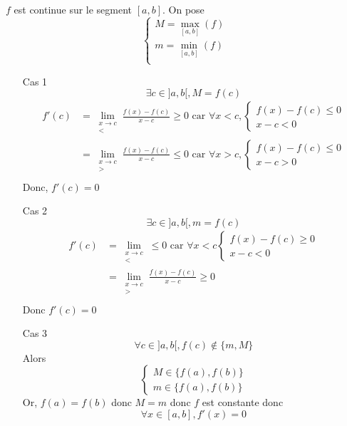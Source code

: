 \begin{prv}
	$f$ est continue sur le segment $[a,b]$. On pose \[
		\begin{cases}
			M = \max_{[a,b]}(f)\\
			m = \min_{[a,b]}(f)\\
		\end{cases}
	\] 

	\begin{itemize}
		\item[\sc Cas 1] \[
				\exists c \in ]a,b[, M = f(c)
			\] 
			\begin{align*}
				f'(c) &= \lim_{\substack{x \to c\\<}}\frac{f(x)-f(c)}{x-c} \ge 0 \text{ car } \forall x < c, \begin{cases}
					f(x) - f(c) \le 0\\
					x - c < 0
				\end{cases} \\
				&= \lim_{\substack{x \to c\\>}}\frac{f(x)-f(c)}{x-c} \le 0 \text{ car } \forall x > c, \begin{cases}
					f(x) - f(c) \le 0\\
					x - c > 0
				\end{cases} \\
			\end{align*}
			Donc, $f'(c) = 0$ 
		\item[\sc Cas 2]
			\[
				\exists c \in ]a,b[, m = f(c)
			\]
			\begin{align*}
				f'(c) &= \lim_{\substack{x \to c\\<}}\le 0 \text{ car } \forall x < c \begin{cases}
					f(x) - f(c) \ge 0\\
					x - c <0
				\end{cases} \\
				&= \lim_{\substack{x\to c\\>}} \frac{f(x) - f(c)}{x-c}\ge 0 \\
			\end{align*}
			Donc $f'(c) = 0$ 
		\item[\sc Cas 3] \[
				\forall c \in ]a,b[, f(c) \not\in \{m,M\}
			\] Alors \[
				\begin{cases}
					M \in \{f(a), f(b)\} \\
					m \in \{f(a), f(b)\} 
				\end{cases}
			\] Or, $f(a) = f(b)$ donc $M = m$ donc $f$ est constante donc \[
			\forall x \in [a,b], f'(x) = 0
			\] 
	\end{itemize}
\end{prv}

